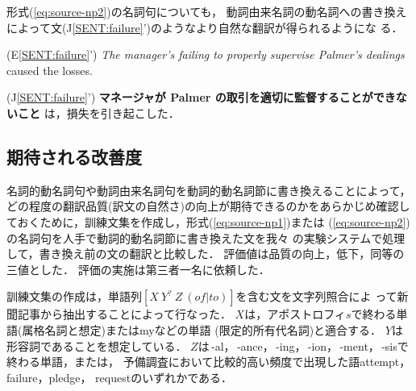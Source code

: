 形式(\ref{eq:source-np2})の名詞句についても，
動詞由来名詞の動名詞への書き換え
によって文(J\ref{SENT:failure}')のようなより自然な翻訳が得られるようにな
る．
\begin{list}{}{\setlength{\leftmargin}{6em}
\setlength{\labelsep}{1em}
\setlength{\labelwidth}{\leftmargin}
\addtolength{\labelwidth}{-\labelsep}
\setlength{\itemsep}{0ex}}
\item[(E\ref{SENT:failure}')\hspace*{1mm}]
{\it The manager's failing to properly 
supervise Palmer's dealings} caused the losses.
\item[(J\ref{SENT:failure}')\hspace*{1mm}]
{\bf マネージャが Palmer の取引を適切に監督することができないこと}
は，損失を引き起こした．
\end{list}

\subsection{期待される改善度}
\label{sec:rewrite:prospect}

名詞的動名詞句や動詞由来名詞句を動詞的動名詞節に書き換えることによって，
どの程度の翻訳品質(訳文の自然さ)の向上が期待できるのかをあらかじめ確認し
ておくために，訓練文集を作成し，形式(\ref{eq:source-np1})または
(\ref{eq:source-np2})の名詞句を人手で動詞的動名詞節に書き換えた文を我々
の実験システムで処理して，書き換え前の文の翻訳と比較した．
評価値は品質の向上，低下，同等の三値とした． 
評価の実施は第三者一名に依頼した．

訓練文集の作成は，単語列$[X\ Y^?\ Z\ (of|to)]$を含む文を文字列照合によ
って新聞記事から抽出することによって行なった．
$X$は，アポストロフィ$s$で終わる単語(属格名詞と想定)またはmyなどの単語
(限定的所有代名詞)と適合する．
$Y$は形容詞であることを想定している．
$Z$は\,-al，\,-ance，\,-ing，\,-ion，\,-ment，\,-sisで終わる単語，または，
予備調査において比較的高い頻度で出現した語attempt，failure，pledge，
requestのいずれかである． 

